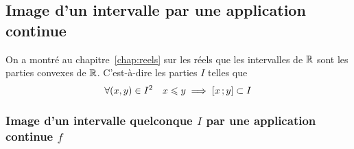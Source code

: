 \subsection{Image d'un intervalle par une application continue}

\begin{rappel}
  On a montré au chapitre~\ref{chap:reels} sur les réels que les intervalles de \(\mathbb{R}\) sont les parties convexes de \(\mathbb{R}\). C'est-à-dire les parties \(I\) telles que
  \begin{equation}
    \forall (x,y) \in I^2 \quad x \leqslant y \implies \left[ x \, ;  y \right] \subset I
  \end{equation}
\end{rappel}

\subsubsection[Image continue d'un intervalle quelconque]{Image d'un intervalle quelconque \(I\) par une application continue \(f\)}

